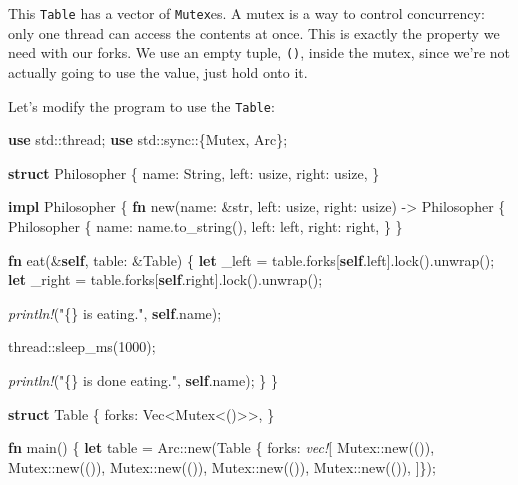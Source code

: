 \documentclass[a4paper,]{book}
\newenvironment{Shaded}{\begin{snugshade}}{\end{snugshade}}
\newcommand{\KeywordTok}[1]{\textcolor[rgb]{0.13,0.29,0.53}{\textbf{{#1}}}}
\newcommand{\DataTypeTok}[1]{\textcolor[rgb]{0.13,0.29,0.53}{{#1}}}
\newcommand{\DecValTok}[1]{\textcolor[rgb]{0.00,0.00,0.81}{{#1}}}
\newcommand{\StringTok}[1]{\textcolor[rgb]{0.31,0.60,0.02}{{#1}}}
\newcommand{\PreprocessorTok}[1]{\textcolor[rgb]{0.56,0.35,0.01}{\textit{{#1}}}}
\newcommand{\NormalTok}[1]{{#1}}
\begin{document}
This \texttt{Table} has a vector of \texttt{Mutex}es. A mutex is a way
to control concurrency: only one thread can access the contents at once.
This is exactly the property we need with our forks. We use an empty
tuple, \texttt{()}, inside the mutex, since we're not actually going to
use the value, just hold onto it.

Let's modify the program to use the \texttt{Table}:

\begin{Shaded}
\begin{Highlighting}[]
\KeywordTok{use} \NormalTok{std::thread;}
\KeywordTok{use} \NormalTok{std::sync::\{Mutex, Arc\};}

\KeywordTok{struct} \NormalTok{Philosopher \{}
    \NormalTok{name: }\DataTypeTok{String}\NormalTok{,}
    \NormalTok{left: }\DataTypeTok{usize}\NormalTok{,}
    \NormalTok{right: }\DataTypeTok{usize}\NormalTok{,}
\NormalTok{\}}

\KeywordTok{impl} \NormalTok{Philosopher \{}
    \KeywordTok{fn} \NormalTok{new(name: &}\DataTypeTok{str}\NormalTok{, left: }\DataTypeTok{usize}\NormalTok{, right: }\DataTypeTok{usize}\NormalTok{) -> Philosopher \{}
        \NormalTok{Philosopher \{}
            \NormalTok{name: name.to_string(),}
            \NormalTok{left: left,}
            \NormalTok{right: right,}
        \NormalTok{\}}
    \NormalTok{\}}

    \KeywordTok{fn} \NormalTok{eat(&}\KeywordTok{self}\NormalTok{, table: &Table) \{}
        \KeywordTok{let} \NormalTok{_left = table.forks[}\KeywordTok{self}\NormalTok{.left].lock().unwrap();}
        \KeywordTok{let} \NormalTok{_right = table.forks[}\KeywordTok{self}\NormalTok{.right].lock().unwrap();}

        \PreprocessorTok{println!}\NormalTok{(}\StringTok{"\{\} is eating."}\NormalTok{, }\KeywordTok{self}\NormalTok{.name);}

        \NormalTok{thread::sleep_ms(}\DecValTok{1000}\NormalTok{);}

        \PreprocessorTok{println!}\NormalTok{(}\StringTok{"\{\} is done eating."}\NormalTok{, }\KeywordTok{self}\NormalTok{.name);}
    \NormalTok{\}}
\NormalTok{\}}

\KeywordTok{struct} \NormalTok{Table \{}
    \NormalTok{forks: }\DataTypeTok{Vec}\NormalTok{<Mutex<()>>,}
\NormalTok{\}}

\KeywordTok{fn} \NormalTok{main() \{}
    \KeywordTok{let} \NormalTok{table = Arc::new(Table \{ forks: }\PreprocessorTok{vec!}\NormalTok{[}
        \NormalTok{Mutex::new(()),}
        \NormalTok{Mutex::new(()),}
        \NormalTok{Mutex::new(()),}
        \NormalTok{Mutex::new(()),}
        \NormalTok{Mutex::new(()),}
    \NormalTok{]\});}


\end{Highlighting}
\end{Shaded}
\end{document}
